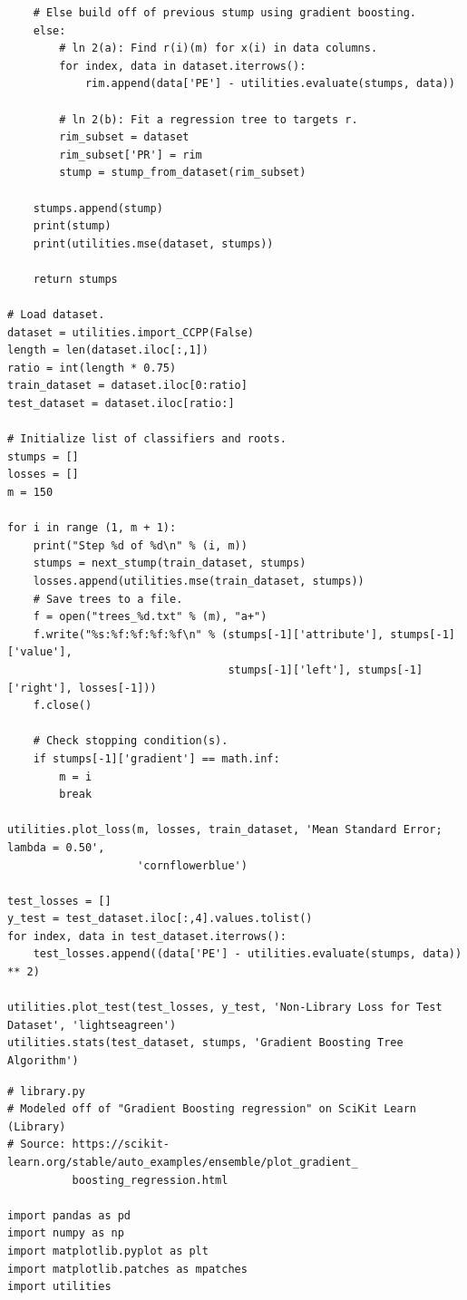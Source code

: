 \documentclass[letterpaper]{article} %
\begin{document}
{\begin{verbatim}
    # Else build off of previous stump using gradient boosting.
    else:
        # ln 2(a): Find r(i)(m) for x(i) in data columns.
        for index, data in dataset.iterrows():
            rim.append(data['PE'] - utilities.evaluate(stumps, data))

        # ln 2(b): Fit a regression tree to targets r.
        rim_subset = dataset
        rim_subset['PR'] = rim
        stump = stump_from_dataset(rim_subset)

    stumps.append(stump)
    print(stump)
    print(utilities.mse(dataset, stumps))

    return stumps

# Load dataset.
dataset = utilities.import_CCPP(False)
length = len(dataset.iloc[:,1])
ratio = int(length * 0.75)
train_dataset = dataset.iloc[0:ratio]
test_dataset = dataset.iloc[ratio:]

# Initialize list of classifiers and roots.
stumps = []
losses = []
m = 150

for i in range (1, m + 1):
    print("Step %d of %d\n" % (i, m))
    stumps = next_stump(train_dataset, stumps)
    losses.append(utilities.mse(train_dataset, stumps))
    # Save trees to a file.
    f = open("trees_%d.txt" % (m), "a+")
    f.write("%s:%f:%f:%f:%f\n" % (stumps[-1]['attribute'], stumps[-1]['value'],
                                  stumps[-1]['left'], stumps[-1]['right'], losses[-1]))
    f.close()
    
    # Check stopping condition(s).
    if stumps[-1]['gradient'] == math.inf:
        m = i
        break

utilities.plot_loss(m, losses, train_dataset, 'Mean Standard Error; lambda = 0.50',
                    'cornflowerblue')

test_losses = []
y_test = test_dataset.iloc[:,4].values.tolist()
for index, data in test_dataset.iterrows():
    test_losses.append((data['PE'] - utilities.evaluate(stumps, data)) ** 2)

utilities.plot_test(test_losses, y_test, 'Non-Library Loss for Test Dataset', 'lightseagreen')
utilities.stats(test_dataset, stumps, 'Gradient Boosting Tree Algorithm')
\end{verbatim}
\bigskip
\begin{verbatim}
# library.py
# Modeled off of "Gradient Boosting regression" on SciKit Learn (Library)
# Source: https://scikit-learn.org/stable/auto_examples/ensemble/plot_gradient_
          boosting_regression.html

import pandas as pd
import numpy as np
import matplotlib.pyplot as plt
import matplotlib.patches as mpatches
import utilities


\end{verbatim}}
\end{document}
